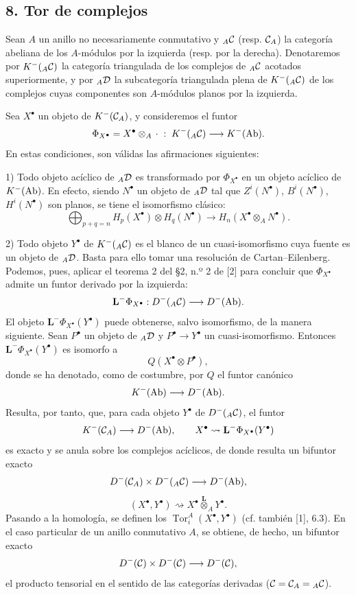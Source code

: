 \subsection*{8. Tor de complejos}

Sean $A$ un anillo no necesariamente conmutativo y ${}_A\mathcal C$ (resp. $\mathcal C_A$) la categoría abeliana de los $A$-módulos por la izquierda (resp. por la derecha). Denotaremos por $K^-({}_A\mathcal C)$ la categoría triangulada de los complejos de ${}_A\mathcal C$ acotados superiormente, y por ${}_A\mathcal D$ la subcategoría triangulada plena de $K^-({}_A\mathcal C)$ de los complejos cuyas componentes son $A$-módulos planos por la izquierda.

Sea $X^\bullet$ un objeto de $K^-(\mathcal C_A)$, y consideremos el funtor
\[
\Phi_{X^\bullet}=X^\bullet\otimes_A\,\cdot\;:\;K^-({}_A\mathcal C)\longrightarrow K^-(\operatorname{Ab}).
\]
En estas condiciones, son válidas las afirmaciones siguientes:

1) Todo objeto acíclico de ${}_A\mathcal D$ es transformado por $\Phi_{X^\bullet}$ en un objeto acíclico de $K^-(\operatorname{Ab})$. En efecto, siendo $N^\bullet$ un objeto de ${}_A\mathcal D$ tal que $Z^i(N^\bullet)$, $B^i(N^\bullet)$, $H^i(N^\bullet)$ son planos, se tiene el isomorfismo clásico:
\[
\bigoplus_{p+q=n}H_p(X^\bullet)\otimes H_q(N^\bullet)
\longrightarrow H_n(X^\bullet\otimes_A N^\bullet).
\]

2) Todo objeto $Y^\bullet$ de $K^-({}_A\mathcal C)$ es el blanco de un cuasi-isomorfismo cuya fuente es un objeto de ${}_A\mathcal D$. Basta para ello tomar una resolución de Cartan--Eilenberg. Podemos, pues, aplicar el teorema 2 del §2, n.º 2 de [2] para concluir que $\Phi_{X^\bullet}$ admite un funtor derivado por la izquierda:
\[
\mathbf L^{-}\Phi_{X^\bullet}:D^-({}_A\mathcal C)\longrightarrow D^-(\operatorname{Ab}).
\]
El objeto $\mathbf L^{-}\Phi_{X^\bullet}(Y^\bullet)$ puede obtenerse, salvo isomorfismo, de la manera siguiente. Sean $P^\bullet$ un objeto de ${}_A\mathcal D$ y $P^\bullet\to Y^\bullet$ un cuasi-isomorfismo. Entonces $\mathbf L^{-}\Phi_{X^\bullet}(Y^\bullet)$ es isomorfo a
\[
Q(X^\bullet\otimes P^\bullet),
\]
donde se ha denotado, como de costumbre, por $Q$ el funtor canónico
\[
K^-(\operatorname{Ab})\longrightarrow D^-(\operatorname{Ab}).
\]
Resulta, por tanto, que, para cada objeto $Y^\bullet$ de $D^-({}_A\mathcal C)$, el funtor
\[
K^-(\mathcal C_A)\longrightarrow D^-(\operatorname{Ab}),\qquad
X^\bullet\rightsquigarrow \mathbf L^{-}\Phi_{X^\bullet}(Y^\bullet)
\]
es exacto y se anula sobre los complejos acíclicos, de donde resulta un bifuntor exacto
\[
D^-(\mathcal C_A)\times D^-({}_A\mathcal C)\longrightarrow D^-(\operatorname{Ab}),
\]
\[
(X^\bullet,Y^\bullet)\rightsquigarrow X^\bullet\overset{\mathbf L}{\otimes}_A Y^\bullet.
\]
Pasando a la homología, se definen los $\operatorname{Tor}_i^A(X^\bullet,Y^\bullet)$ (cf. también [1], 6.3). En el caso particular de un anillo conmutativo $A$, se obtiene, de hecho, un bifuntor exacto
\[
D^-(\mathcal C)\times D^-(\mathcal C)\longrightarrow D^-(\mathcal C),
\]
el producto tensorial en el sentido de las categorías derivadas ($\mathcal C=\mathcal C_A={}_A\mathcal C$).
